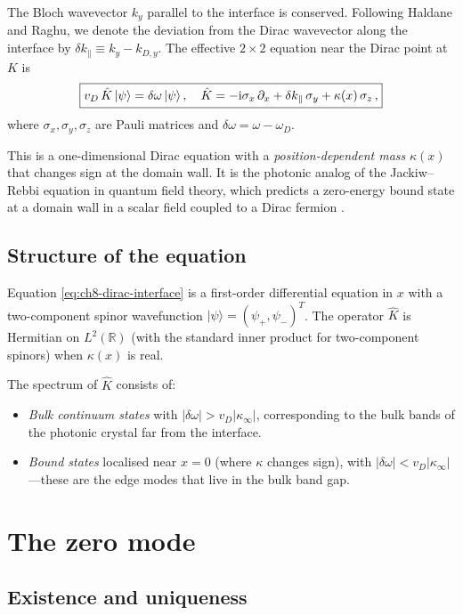 The Bloch wavevector $k_y$ parallel to the interface is conserved.
Following Haldane and Raghu, we denote the deviation from the Dirac
wavevector along the interface by $\delta k_\parallel\equiv k_y-k_{D,y}$.
The effective $2\times 2$ equation near the Dirac point at $K$ is
\begin{equation}\label{eq:ch8-dirac-interface}
  \boxed{%
  v_D\,\hat{K}\,|\psi\rangle = \delta\omega\,|\psi\rangle\,,
  \quad
  \hat{K} = -\ii\sigma_x\,\partial_x
  + \delta k_\parallel\,\sigma_y
  + \kappa(x)\,\sigma_z\,,}
\end{equation}
where $\sigma_x,\sigma_y,\sigma_z$ are Pauli matrices and
$\delta\omega=\omega-\omega_D$.

This is a one-dimensional Dirac equation with a
\emph{position-dependent mass} $\kappa(x)$ that changes sign at the
domain wall.  It is the photonic analog of the Jackiw--Rebbi equation in
quantum field theory, which predicts a zero-energy bound state at a
domain wall in a scalar field coupled to a Dirac fermion
\cite{raghu2008analogs}.

\subsection{Structure of the equation}
\label{sec:ch8-structure}

Equation \eqref{eq:ch8-dirac-interface} is a first-order differential
equation in $x$ with a two-component spinor wavefunction
$|\psi\rangle=(\psi_+,\psi_-)^T$.  The operator $\hat{K}$ is Hermitian
on $L^2(\mathbb{R})$ (with the standard inner product for two-component
spinors) when $\kappa(x)$ is real.

The spectrum of $\hat{K}$ consists of:
\begin{itemize}
  \item \emph{Bulk continuum states} with $|\delta\omega|>v_D|\kappa_\infty|$,
  corresponding to the bulk bands of the photonic crystal far from the
  interface.
  \item \emph{Bound states} localised near $x=0$ (where $\kappa$ changes
  sign), with $|\delta\omega|<v_D|\kappa_\infty|$---these are the edge
  modes that live in the bulk band gap.
\end{itemize}

\section{The zero mode}
\label{sec:ch8-zero-mode}

\subsection{Existence and uniqueness}
\label{sec:ch8-zero-mode-existence}

